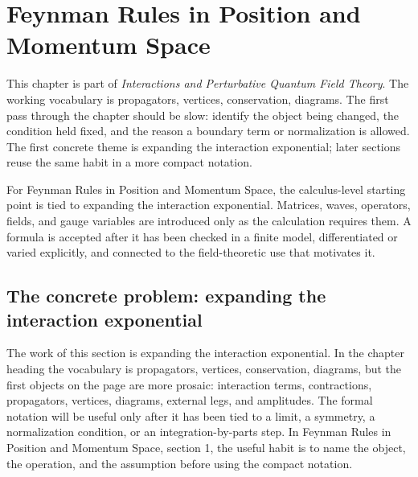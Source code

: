 \chapter{Feynman Rules in Position and Momentum Space}


This chapter is part of \emph{Interactions and Perturbative Quantum Field Theory}.  The working vocabulary is propagators, vertices, conservation, diagrams.  The first pass through the chapter should be slow: identify the object being changed, the condition held fixed, and the reason a boundary term or normalization is allowed.  The first concrete theme is expanding the interaction exponential; later sections reuse the same habit in a more compact notation.

For Feynman Rules in Position and Momentum Space, the calculus-level starting point is tied to expanding the interaction exponential.  Matrices, waves, operators, fields, and gauge variables are introduced only as the calculation requires them.  A formula is accepted after it has been checked in a finite model, differentiated or varied explicitly, and connected to the field-theoretic use that motivates it.

\section{The concrete problem: expanding the interaction exponential}













The work of this section is expanding the interaction exponential.  In the chapter heading the vocabulary is propagators, vertices, conservation, diagrams, but the first objects on the page are more prosaic: interaction terms, contractions, propagators, vertices, diagrams, external legs, and amplitudes.  The formal notation will be useful only after it has been tied to a limit, a symmetry, a normalization condition, or an integration-by-parts step.  In Feynman Rules in Position and Momentum Space, section 1, the useful habit is to name the object, the operation, and the assumption before using the compact notation.

